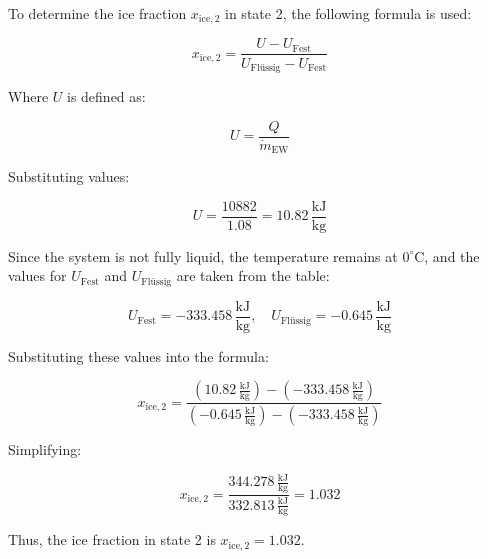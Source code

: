 To determine the ice fraction \( x_{\text{ice},2} \) in state 2, the following formula is used:  

\[
x_{\text{ice},2} = \frac{U - U_{\text{Fest}}}{U_{\text{Flüssig}} - U_{\text{Fest}}}
\]  

Where \( U \) is defined as:  

\[
U = \frac{Q}{\dot{m}_{\text{EW}}}
\]  

Substituting values:  

\[
U = \frac{10882}{1.08} = 10.82 \, \frac{\text{kJ}}{\text{kg}}
\]  

Since the system is not fully liquid, the temperature remains at \( 0^\circ\text{C} \), and the values for \( U_{\text{Fest}} \) and \( U_{\text{Flüssig}} \) are taken from the table:  

\[
U_{\text{Fest}} = -333.458 \, \frac{\text{kJ}}{\text{kg}}, \quad U_{\text{Flüssig}} = -0.645 \, \frac{\text{kJ}}{\text{kg}}
\]  

Substituting these values into the formula:  

\[
x_{\text{ice},2} = \frac{(10.82 \, \frac{\text{kJ}}{\text{kg}}) - (-333.458 \, \frac{\text{kJ}}{\text{kg}})}{(-0.645 \, \frac{\text{kJ}}{\text{kg}}) - (-333.458 \, \frac{\text{kJ}}{\text{kg}})}
\]  

Simplifying:  

\[
x_{\text{ice},2} = \frac{344.278 \, \frac{\text{kJ}}{\text{kg}}}{332.813 \, \frac{\text{kJ}}{\text{kg}}} = 1.032
\]  

Thus, the ice fraction in state 2 is \( x_{\text{ice},2} = 1.032 \).